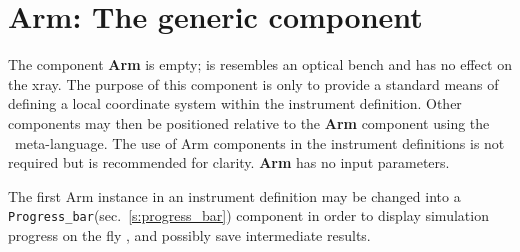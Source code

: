 \section{Arm: The generic component}
\label{s:arm}

The component {\bf Arm} is empty; is resembles an optical bench
and has no effect on the xray.
The purpose of this component is only to provide a standard
means of defining a local coordinate system within the instrument definition.
Other components may then be
positioned relative to the {\bf Arm} component
using the \MCX\ meta-language.
The use of {\rm Arm} components in the instrument definitions
is not required but is recommended for clarity.
{\bf Arm} has no input parameters.

The first Arm instance in an instrument definition may be changed into a
\verb+Progress_bar+(sec.~\ref{s:progress_bar}) component in order to display
simulation progress on the fly , and possibly save intermediate results.
